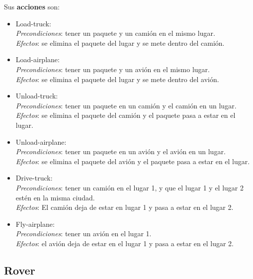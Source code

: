 \documentclass{uc3mpracticas}
\begin{document}
  Sus \textbf{acciones} son:
  \begin{itemize}
    \item Load-truck:
    \\\textit{Precondiciones}: tener un paquete y un camión en el mismo lugar.
    \\\textit{Efectos}: se elimina el paquete del lugar y se mete dentro del camión.
    \item Load-airplane:
    \\\textit{Precondiciones}: tener un paquete y un avión en el mismo lugar.
    \\\textit{Efectos}: se elimina el paquete del lugar y se mete dentro del avión.
    \item Unload-truck:
    \\\textit{Precondiciones}: tener un paquete en un camión y el camión en un lugar.
    \\\textit{Efectos}: se elimina el paquete del camión y el paquete pasa a estar en el lugar.
    \item Unload-airplane:
    \\\textit{Precondiciones}: tener un paquete en un avión y el avión en un lugar.
    \\\textit{Efectos}: se elimina el paquete del avión y el paquete pasa a estar en el lugar.
    \item Drive-truck:
    \\\textit{Precondiciones}: tener un camión en el lugar 1, y que el lugar 1 y el lugar 2 estén en la misma ciudad.
    \\\textit{Efectos}: El camión deja de estar en lugar 1 y pasa a estar en el lugar 2.
    \item Fly-airplane:
    \\\textit{Precondiciones}: tener un avión en el lugar 1.
    \\\textit{Efectos}: el avión deja de estar en el lugar 1 y pasa a estar en el lugar 2.
  \end{itemize}



  \subsection{Rover}
\end{document}
